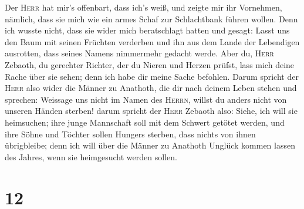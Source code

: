  Der \textsc{Herr} hat mir's offenbart, dass ich's weiß,
und zeigte mir ihr Vornehmen,  nämlich, dass sie mich wie
ein armes Schaf zur Schlachtbank führen wollen. Denn ich wusste nicht,
dass sie wider mich beratschlagt hatten und gesagt: Lasst uns den Baum
mit seinen Früchten verderben und ihn aus dem Lande der Lebendigen
ausrotten, dass seines Namens nimmermehr gedacht werde. 
Aber du, \textsc{Herr} Zebaoth, du gerechter Richter, der du Nieren und
Herzen prüfst, lass mich deine Rache über sie sehen; denn ich habe dir
meine Sache befohlen.  Darum spricht der \textsc{Herr}
also wider die Männer zu Anathoth, die dir nach deinem Leben stehen und
sprechen: Weissage uns nicht im Namen des \textsc{Herrn}, willst du
anders nicht von unseren Händen sterben!  darum spricht
der \textsc{Herr} Zebaoth also: Siehe, ich will sie heimsuchen; ihre
junge Mannschaft soll mit dem Schwert getötet werden, und ihre Söhne und
Töchter sollen Hungers sterben, dass nichts von ihnen übrigbleibe;
 denn ich will über die Männer zu Anathoth Unglück kommen
lassen des Jahres, wenn sie heimgesucht werden sollen.

\hypertarget{section-11}{%
\section{12}\label{section-11}}

